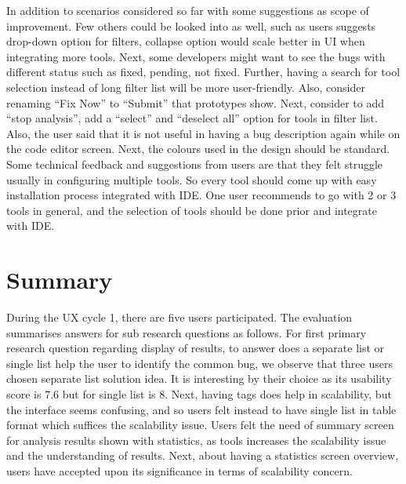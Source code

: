 In addition to scenarios considered so far with some suggestions as scope of improvement. Few others could be looked into as well, such as users suggests drop-down option for filters, collapse option would scale better in UI when integrating more tools. Next, some developers might want to see the bugs with different status such as fixed, pending, not fixed. Further, having a search for tool selection instead of long filter list will be more user-friendly. Also, consider renaming “Fix Now” to “Submit” that prototypes show. Next, consider to add “stop analysis”, add a “select” and “deselect all” option for tools in filter list. Also, the user said that it is not useful in having a bug description again while on the code editor screen. Next, the colours used in the design should be standard. Some technical feedback and suggestions from users are that they felt struggle usually in configuring multiple tools. So every tool should come up with easy installation process integrated with IDE. One user recommends to go with 2 or 3 tools in general, and the selection of tools should be done prior and integrate with IDE.

\section{Summary}

During the UX cycle 1, there are five users participated. The evaluation summarises answers for sub research questions as follows. For first primary research question regarding display of results, to answer does a separate list or single list help the user to identify the common bug, we observe that three users chosen separate list solution idea. It is interesting by their choice as its usability score is 7.6 but for single list is 8. Next, having tags does help in scalability, but the interface seems confusing, and so users felt instead to have single list in table format which suffices the scalability issue. Users felt the need of summary screen for analysis results shown with statistics, as tools increases the scalability issue and the understanding of results. Next, about having a statistics screen overview, users have accepted upon its significance in terms of scalability concern. \\ \\
   
